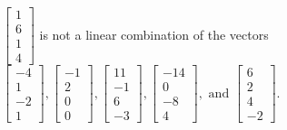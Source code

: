 \begin{exercise}
\begin{exerciseStatement}
  \end{exerciseStatement}
  \begin{exerciseAnswer}
   \(\left[\begin{array}{c}
1 \\
6 \\
1 \\
4
\end{array}\right]\) 
  	 is not  
	a linear combination of the vectors \(\left[\begin{array}{c}
-4 \\
1 \\
-2 \\
1
\end{array}\right] , \left[\begin{array}{c}
-1 \\
2 \\
0 \\
0
\end{array}\right] , \left[\begin{array}{c}
11 \\
-1 \\
6 \\
-3
\end{array}\right] , \left[\begin{array}{c}
-14 \\
0 \\
-8 \\
4
\end{array}\right] , \text{ and } \left[\begin{array}{c}
6 \\
2 \\
4 \\
-2
\end{array}\right]\).

	
  


  \end{exerciseAnswer}
\end{exercise}